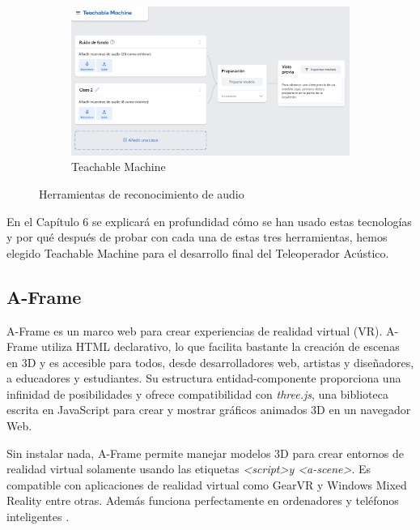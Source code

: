 \begin{figure}[H]
\begin{subfigure}{.3\linewidth}
       \includegraphics[width=1\textwidth, height=0.7\textwidth]{chapters/images/tm.png}
        \caption{Teachable Machine}
    \end{subfigure}
    \caption{Herramientas de reconocimiento de audio}
\end{figure}


En el Capítulo 6 se explicará en profundidad cómo se han usado estas tecnologías y por qué después de probar con cada una de estas tres herramientas, hemos elegido Teachable Machine para el desarrollo final del Teleoperador Acústico.


\subsection{A-Frame}

A-Frame es un marco web para crear experiencias de realidad virtual (VR). A-Frame utiliza HTML declarativo, lo que facilita bastante la creación de escenas en 3D y es accesible para todos, desde desarrolladores web, artistas y diseñadores, a educadores y estudiantes. Su estructura entidad-componente proporciona una infinidad de posibilidades y ofrece compatibilidad con \textit{three.js}, una biblioteca  escrita en JavaScript para crear y mostrar gráficos animados 3D en un navegador Web. 

Sin instalar nada, A-Frame permite manejar modelos 3D para crear entornos de realidad virtual solamente usando las etiquetas \textit{\textless script\textgreater  y \textless a-scene\textgreater}. Es compatible con aplicaciones de realidad virtual como GearVR y Windows Mixed Reality entre otras. Además funciona perfectamente en ordenadores y teléfonos inteligentes \cite{aframe}. 


